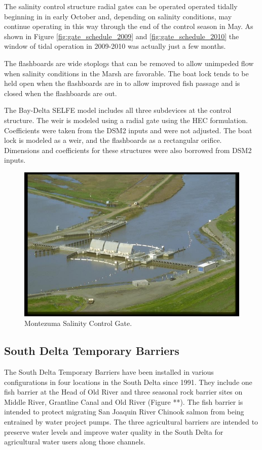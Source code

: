 The salinity control structure radial gates can be operated operated tidally beginning in in early 
October and, depending on salinity conditions, may continue operating in this way 
through the end of the control season in May. As shown in Figure \ref{fig:gate_schedule_2009} and \ref{fig:gate_schedule_2010} 
the window of tidal operation in 2009-2010 was actually just a few months. 

The flashboards are wide stoplogs that can be removed to allow unimpeded flow when salinity conditions in the Marsh are favorable. The boat lock tends to be held open when the flashboards are in to allow improved fish passage and is closed when the flashboards are out. 

The Bay-Delta SELFE model includes all three subdevices at the control structure. 
The weir is modeled using a radial gate using the HEC formulation. Coefficients were taken from
the DSM2 inputs and were not adjusted. The boat lock is modeled as a weir, and the flashboards as a rectangular orifice. 
Dimensions and coefficients for these structures were also borrowed from 
DSM2 inputs. 

\begin{figure}
	\centering
		\includegraphics[scale=0.5]{image/smscg}
	\caption{Montezuma Salinity Control Gate.}
	\label{fig:montezuma}
\end{figure}

\subsection{South Delta Temporary Barriers} The South Delta Temporary Barriers have been installed in
various configurations in four locations in the South Delta since 1991. They include one fish barrier 
at the Head of Old River and three seasonal rock barrier sites on Middle River, Grantline Canal and Old River (Figure **). The fish barrier is intended to protect migrating San Joaquin River Chinook salmon from being entrained by 
water project pumps. The three agricultural barriers are intended to preserve water levels 
and improve water quality in the South Delta for agricultural water users along those channels. 

